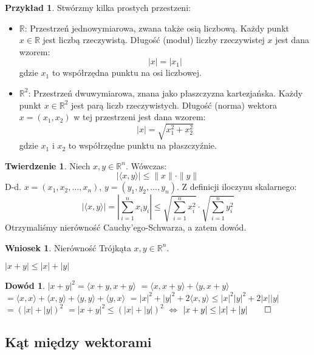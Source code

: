 \documentclass{article}
\theoremstyle{definition}
\theoremstyle{definition}
\newtheorem{tw}{Twierdzenie}[subsection]
\theoremstyle{definition}
\newtheorem{pk}{Przykład}[subsection]
\theoremstyle{definition}
\newtheorem*{wn}{Wniosek}
\theoremstyle{definition}
\newtheorem*{dw}{Dowód}
\theoremstyle{definition}
\theoremstyle{definition}
\begin{document}
\begin{pk}
    Stwórzmy kilka prostych przestzeni:
    \begin{itemize}
        \item \(\mathbb{R}\): Przestrzeń jednowymiarowa, zwana także osią liczbową. Każdy punkt \(x \in \mathbb{R}\) jest liczbą rzeczywistą. Długość (moduł) liczby rzeczywistej \(x\) jest dana wzorem:
        \[
        |x| = |x_1|
        \]
        gdzie \(x_1\) to współrzędna punktu na osi liczbowej.
        
        \item \(\mathbb{R}^2\): Przestrzeń dwuwymiarowa, znana jako płaszczyzna kartezjańska. Każdy punkt \(x \in \mathbb{R}^2\) jest parą liczb rzeczywistych. Długość (norma) wektora \(x = (x_1, x_2)\) w tej przestrzeni jest dana wzorem:
        \[
        |x| = \sqrt{x_1^2 + x_2^2}
        \]
        gdzie \(x_1\) i \(x_2\) to współrzędne punktu na płaszczyźnie.
    \end{itemize}
\end{pk}

\begin{tw}
    Niech \( x,y \in \mathbb{R}^n \). Wówczas:
    \[
        |\langle x,y \rangle| \leq \|x\| \cdot \|y\|
    \]
    D-d. \( x=(x_1,x_2,\dots,x_n) \), \( y=(y_1,y_2,\dots, y_n) \). Z definicji iloczynu skalarnego:
    \[
        |\langle x,y \rangle| = \left| \sum_{i=1}^{n} x_i y_i \right| \leq \sqrt{\sum_{i=1}^{n} x_i^2} \cdot \sqrt{\sum_{i=1}^{n} y_i^2}
    \]
    Otrzymaliśmy nierówność Cauchy'ego-Schwarza, a zatem dowód.
\end{tw}
\begin{wn}
Nierówność Trójkąta $x,y\in\mathbb{R}^n$.
\begin{center}
	$|x+y| \leq |x| + |y|$
\end{center}
    \begin{dw}
        $|x+y|^2=\langle x+y, x+y \rangle$
        $= \langle x, x+y \rangle + \langle y, x+y \rangle$
        $= \langle x, x \rangle + \langle x, y \rangle + \langle y, y \rangle + \langle y, x \rangle$
        $=|x|^2+|y|^2 + 2\langle x,y \rangle \leq |x|^2 |y|^2 + 2|x||y|$
        $=(|x|+|y|)^2$
        $=|x+y|^2 \leq (|x|+|y|)^2$
        $\iff$
        $|x+y| \leq |x| + |y|\qed$
    \end{dw}
\end{wn}

\subsection{Kąt między wektorami}
\end{document}
